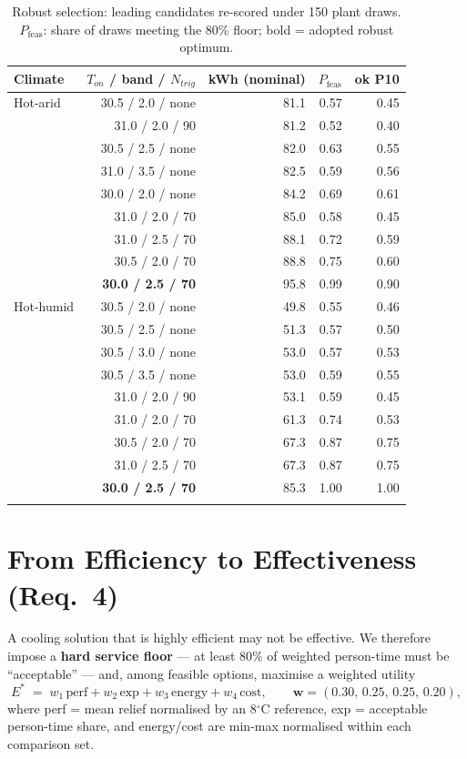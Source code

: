 \documentclass[11pt]{article}
\newcommand{\degrees}{\ensuremath{^\circ}}
\begin{document}
\begin{table}[H]\centering\small
\caption{Robust selection: leading candidates re-scored under 150 plant draws. $P_{\text{feas}}$: share of draws meeting the 80\% floor; bold = adopted robust optimum.}\label{tab:robust}
\begin{tabular}{@{}lrrrr@{}}
\toprule
Climate & $T_{on}$ / band / $N_{trig}$ & kWh (nominal) & $P_{\text{feas}}$ & ok P10\\
\midrule
Hot-arid & 30.5 / 2.0 / none & 81.1 & 0.57 & 0.45 \\
 & 31.0 / 2.0 / 90 & 81.2 & 0.52 & 0.40 \\
 & 30.5 / 2.5 / none & 82.0 & 0.63 & 0.55 \\
 & 31.0 / 3.5 / none & 82.5 & 0.59 & 0.56 \\
 & 30.0 / 2.0 / none & 84.2 & 0.69 & 0.61 \\
 & 31.0 / 2.0 / 70 & 85.0 & 0.58 & 0.45 \\
 & 31.0 / 2.5 / 70 & 88.1 & 0.72 & 0.59 \\
 & 30.5 / 2.0 / 70 & 88.8 & 0.75 & 0.60 \\
 & \textbf{30.0 / 2.5 / 70} & 95.8 & 0.99 & 0.90 \\
\addlinespace
Hot-humid & 30.5 / 2.0 / none & 49.8 & 0.55 & 0.46 \\
 & 30.5 / 2.5 / none & 51.3 & 0.57 & 0.50 \\
 & 30.5 / 3.0 / none & 53.0 & 0.57 & 0.53 \\
 & 30.5 / 3.5 / none & 53.0 & 0.59 & 0.55 \\
 & 31.0 / 2.0 / 90 & 53.1 & 0.59 & 0.45 \\
 & 31.0 / 2.0 / 70 & 61.3 & 0.74 & 0.53 \\
 & 30.5 / 2.0 / 70 & 67.3 & 0.87 & 0.75 \\
 & 31.0 / 2.5 / 70 & 67.3 & 0.87 & 0.75 \\
 & \textbf{30.0 / 2.5 / 70} & 85.3 & 1.00 & 1.00 \\
\addlinespace
\bottomrule
\end{tabular}
\end{table}

\section{From Efficiency to Effectiveness (Req.\ 4)}
A cooling solution that is highly efficient may not be effective. We therefore impose a \textbf{hard service floor} --- at least 80\% of weighted person-time must be ``acceptable'' --- and, among feasible options, maximise a weighted utility
\begin{equation}
E^\ast \;=\; w_1\,\text{perf} + w_2\,\text{exp} + w_3\,\text{energy} + w_4\,\text{cost},
\qquad \mathbf{w}=(0.30,\,0.25,\,0.25,\,0.20),
\end{equation}
where perf = mean relief normalised by an $8\degrees$C reference, exp = acceptable person-time share, and energy/cost are min-max normalised within each comparison set.
\end{document}
